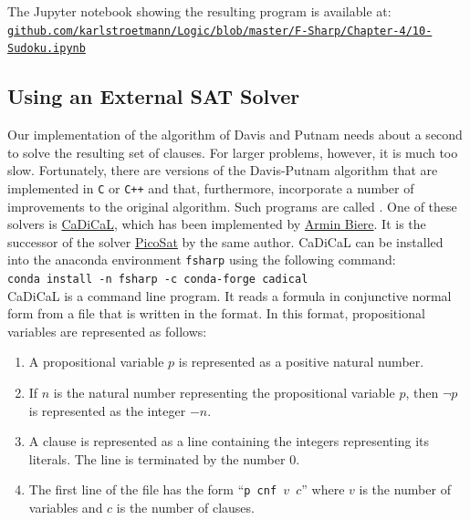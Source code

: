 The Jupyter notebook showing the resulting program is available at:
\\[0.2cm]
\hspace*{1.3cm}
\href{https://github.com/karlstroetmann/Logic/blob/master/F-Sharp/Chapter-4/10-Sudoku.ipynb}{\texttt{github.com/karlstroetmann/Logic/blob/master/F-Sharp/Chapter-4/10-Sudoku.ipynb}}


\pagebreak

\hspace*{\fill}
\pagebreak

\subsection{Using an External SAT Solver}
Our implementation of the algorithm of Davis and Putnam needs about a second to solve the resulting set of
clauses.  For larger problems, however, it is much too slow.  Fortunately, there are versions of the Davis-Putnam
algorithm that are
implemented in \texttt{C} or \texttt{C++} and that, furthermore, incorporate a number of improvements to the
original algorithm.  Such programs are called .  
One of these solvers is \href{https://github.com/arminbiere/cadical}{CaDiCaL}, which has been implemented by
\href{https://cca.informatik.uni-freiburg.de/biere/}{Armin Biere}.  It is the successor of the solver
\href{https://fmv.jku.at/picosat/}{PicoSat} by the same author.  CaDiCaL can be installed into the anaconda
environment \texttt{fsharp} using the following command:
\\[0.2cm]
\hspace*{1.3cm}
\texttt{conda install -n fsharp -c conda-forge cadical}
\\[0.2cm]
CaDiCaL is a command line program.  It reads a formula in conjunctive normal form from a file that is written in
the  format.    In this format, propositional variables are represented as follows:
\begin{enumerate}
\item A propositional variable $p$ is represented as a positive natural number.
\item If $n$ is the natural number representing the propositional variable $p$, then $\neg p$ is represented as
      the integer $-n$. 
\item A clause is represented as a line containing the integers representing its literals.  The line is
      terminated by the number $0$.
\item The first line of the file has the form ``\texttt{p cnf $v$ $c$}'' where $v$ is the number of variables and
      $c$ is the number of clauses.
\end{enumerate}
